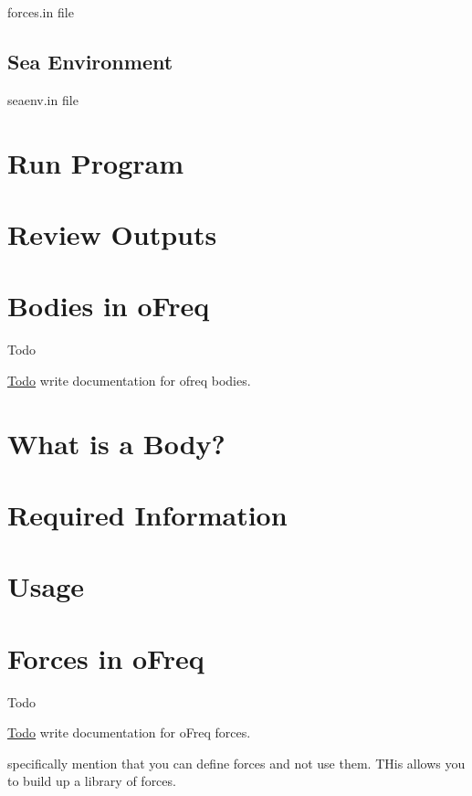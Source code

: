 forces.\-in file

\subsection*{Sea Environment}

seaenv.\-in file

\section*{Run Program}

\section*{Review Outputs}\hypertarget{concept_bodies}{}\section{Bodies in o\-Freq}\label{concept_bodies}
\begin{DoxyRefDesc}{Todo}
\item[\hyperlink{todo__todo000001}{Todo}]write documentation for ofreq bodies.\end{DoxyRefDesc}


\section*{What is a Body?}

\section*{Required Information}

\section*{Usage}\hypertarget{concept_forces}{}\section{Forces in o\-Freq}\label{concept_forces}
\begin{DoxyRefDesc}{Todo}
\item[\hyperlink{todo__todo000002}{Todo}]write documentation for o\-Freq forces.
\begin{DoxyItemize}
\item specifically mention that you can define forces and not use them. T\-His allows you to build up a library of forces.
\end{DoxyItemize}\end{DoxyRefDesc}


